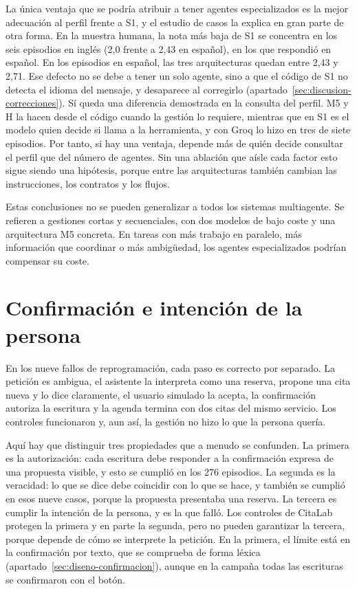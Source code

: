 La única ventaja que se podría atribuir a tener agentes especializados es la
mejor adecuación al perfil frente a S1, y el estudio de casos la explica en
gran parte de otra forma. En la muestra humana, la nota más baja de S1 se
concentra en los seis episodios en inglés (2,0 frente a 2,43 en español), en
los que respondió en español. En los episodios en español, las tres
arquitecturas quedan entre 2,43 y 2,71. Ese defecto no se debe a tener un solo
agente, sino a que el código de S1 no detecta el idioma del mensaje, y
desaparece al corregirlo (apartado~\ref{sec:discusion-correcciones}). Sí queda
una diferencia demostrada en la consulta del perfil. M5 y H la hacen desde el
código cuando la gestión lo requiere, mientras que en S1 es el modelo quien
decide si llama a la herramienta, y con Groq lo hizo en tres de siete
episodios. Por tanto, si hay una ventaja, depende más de quién decide consultar
el perfil que del número de agentes. Sin una ablación que aísle cada factor
esto sigue siendo una hipótesis, porque entre las arquitecturas también cambian
las instrucciones, los contratos y los flujos.

Estas conclusiones no se pueden generalizar a todos los sistemas multiagente.
Se refieren a gestiones cortas y secuenciales, con dos modelos de bajo coste y
una arquitectura M5 concreta. En tareas con más trabajo en paralelo, más
información que coordinar o más ambigüedad, los agentes especializados podrían
compensar su coste.

\section{Confirmación e intención de la persona}
\label{sec:discusion-intencion}

En los nueve fallos de reprogramación, cada paso es correcto por separado. La
petición es ambigua, el asistente la interpreta como una reserva, propone una
cita nueva y lo dice claramente, el usuario simulado la acepta, la confirmación
autoriza la escritura y la agenda termina con dos citas del mismo servicio. Los
controles funcionaron y, aun así, la gestión no hizo lo que la persona quería.

Aquí hay que distinguir tres propiedades que a menudo se confunden. La primera
es la autorización: cada escritura debe responder a la confirmación expresa de
una propuesta visible, y esto se cumplió en los 276 episodios. La segunda es la
veracidad: lo que se dice debe coincidir con lo que se hace, y también se
cumplió en esos nueve casos, porque la propuesta presentaba una reserva. La
tercera es cumplir la intención de la persona, y es la que falló. Los controles
de CitaLab protegen la primera y en parte la segunda, pero no pueden garantizar
la tercera, porque depende de cómo se interprete la petición. En la primera, el
límite está en la confirmación por texto, que se comprueba de forma léxica
(apartado~\ref{sec:diseno-confirmacion}), aunque en la campaña todas las
escrituras se confirmaron con el botón.

